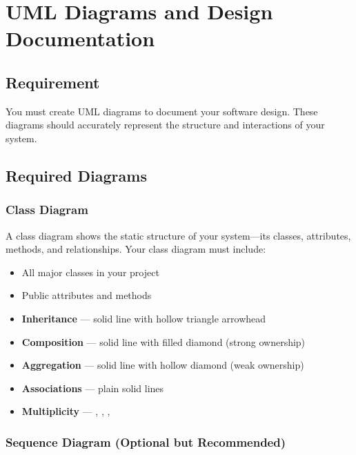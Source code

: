 
\section{UML Diagrams and Design Documentation}

\subsection{Requirement}

You must create UML diagrams to document your software design. These diagrams should accurately represent the structure and interactions of your system.

\subsection{Required Diagrams}

\subsubsection{Class Diagram}

A class diagram shows the static structure of your system---its classes, attributes, methods, and relationships. Your class diagram must include:

\begin{itemize}
  \item All major classes in your project
  \item Public attributes and methods
  \item \textbf{Inheritance} --- solid line with hollow triangle arrowhead
  \item \textbf{Composition} --- solid line with filled diamond (strong ownership)
  \item \textbf{Aggregation} --- solid line with hollow diamond (weak ownership)
  \item \textbf{Associations} --- plain solid lines
  \item \textbf{Multiplicity} --- , , \code{*}, 
\end{itemize}

\subsubsection{Sequence Diagram (Optional but Recommended)}

